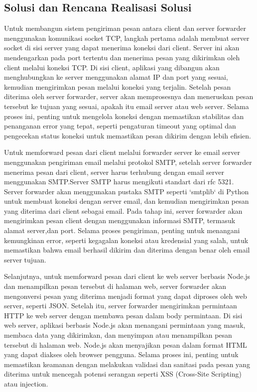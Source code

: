 \documentclass[12pt, a4paper]{article}
\begin{document}
\subsection{Solusi dan Rencana Realisasi Solusi}
\begin{adjustwidth}{1.4cm}{0cm}
\quad Untuk membangun sistem pengiriman pesan antara client dan server forwarder menggunakan komunikasi socket TCP, langkah pertama adalah membuat server socket di sisi server yang dapat menerima koneksi dari client. Server ini akan mendengarkan pada port tertentu dan menerima pesan yang dikirimkan oleh client melalui koneksi TCP. Di sisi client, aplikasi yang dibangun akan menghubungkan ke server menggunakan alamat IP dan port yang sesuai, kemudian mengirimkan pesan melalui koneksi yang terjalin. Setelah pesan diterima oleh server forwarder, server akan memprosesnya dan meneruskan pesan tersebut ke tujuan yang sesuai, apakah itu email server atau web server. Selama proses ini, penting untuk mengelola koneksi dengan memastikan stabilitas dan penanganan error yang tepat, seperti pengaturan timeout yang optimal dan pengecekan status koneksi untuk memastikan pesan dikirim dengan lebih efisien.

Untuk memforward pesan dari client melalui forwarder server ke email server menggunakan pengiriman email melalui protokol SMTP, setelah server forwarder menerima pesan dari client, server harus terhubung dengan email server menggunakan SMTP.Server SMTP harus mengikuti standart dari rfc 5321. Server forwarder akan menggunakan pustaka SMTP seperti `smtplib` di Python untuk membuat koneksi dengan server email, dan kemudian mengirimkan pesan yang diterima dari client sebagai email. Pada tahap ini, server forwarder akan mengirimkan pesan client dengan menggunakan informasi SMTP, termasuk alamat server,dan port. Selama proses pengiriman, penting untuk menangani kemungkinan error, seperti kegagalan koneksi atau kredensial yang salah, untuk memastikan bahwa email berhasil dikirim dan diterima dengan benar oleh email server tujuan.

Selanjutnya, untuk memforward pesan dari client ke web server berbasis Node.js dan menampilkan pesan tersebut di halaman web, server forwarder akan mengonversi pesan yang diterima menjadi format yang dapat diproses oleh web server, seperti JSON. Setelah itu, server forwarder mengirimkan permintaan HTTP ke web server dengan membawa pesan dalam body permintaan. Di sisi web server, aplikasi berbasis Node.js akan menangani permintaan yang masuk, membaca data yang dikirimkan, dan menyimpan atau menampilkan pesan tersebut di halaman web. Node.js akan menyajikan pesan dalam format HTML yang dapat diakses oleh browser pengguna. Selama proses ini, penting untuk memastikan keamanan dengan melakukan validasi dan sanitasi pada pesan yang diterima untuk mencegah potensi serangan seperti XSS (Cross-Site Scripting) atau injection.
\end{adjustwidth}
\end{document}
